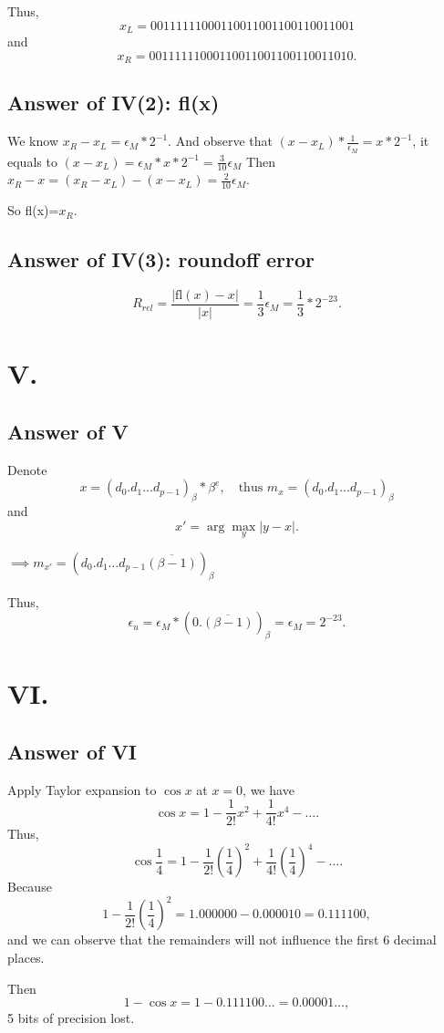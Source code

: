 \documentclass[a4paper]{article}
\begin{document}
Thus, $$x_L=00111111000110011001100110011001$$ and $$x_R=00111111000110011001100110011010.$$

\subsection*{Answer of IV(2): fl(x)}
We know $x_R-x_L=\epsilon_M*2^{-1}$. 
And observe that $(x-x_L)*\frac{1}{\epsilon_M}=x*2^{-1}$, it equals to $(x-x_L)=\epsilon_M*x*2^{-1}=\frac{3}{10}\epsilon_M$
Then $x_R-x=(x_R-x_L)-(x-x_L)=\frac{2}{10}\epsilon_M.$

So fl(x)=$x_R$.

\subsection*{Answer of IV(3): roundoff error}
$$R_{rel}=\frac{|\text{fl}(x)-x|}{|x|}=\frac{1}{3}\epsilon_M=\frac{1}{3}*2^{-23}.$$

\section*{V.}

\subsection*{Answer of V}
Denote $$x=(d_0.d_1\ldots d_{p-1})_\beta*\beta^e,\quad \text{thus } m_x=(d_0.d_1\ldots d_{p-1})_\beta$$
and 
$$x'=\arg\max_y |y-x|.$$

$\implies m_{x'}=(d_0.d_1\ldots d_{p-1} \overline{(\beta-1)})_\beta$

Thus, $$\epsilon_u=\epsilon_M*(0.\overline{(\beta-1)})_\beta=\epsilon_M=2^{-23}.$$

\section*{VI.}

\subsection*{Answer of VI}
Apply Taylor expansion to $\cos x$ at $x=0$, we have
$$\cos x=1-\frac{1}{2!}x^2+\frac{1}{4!}x^4-\ldots.$$
Thus, 
$$\cos \frac{1}{4}=1-\frac{1}{2!}(\frac{1}{4})^2+\frac{1}{4!}(\frac{1}{4})^4-\ldots.$$
Because $$1-\frac{1}{2!}(\frac{1}{4})^2=1.000000-0.000010=0.111100,$$
and we can observe that the remainders will not influence the first 6 decimal places.

Then $$1-\cos x=1-0.111100\ldots=0.00001\ldots,$$ 5 bits of precision lost.
\end{document}
